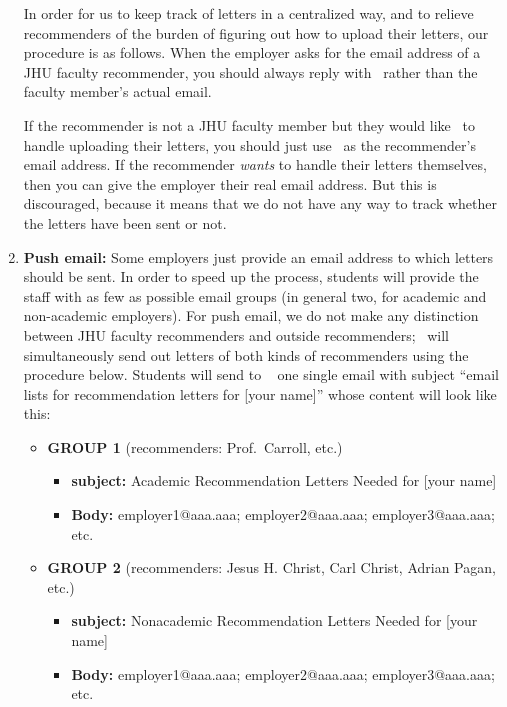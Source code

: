 \documentclass{econtex}
\begin{document}
\begin{enumerate}
  In order for us to keep track of letters in a centralized way, and
  to relieve recommenders of the burden of figuring out how to
  upload their letters, our procedure is as follows.  When the
  employer asks for the email address of a JHU faculty recommender, you should
  always reply with \JMStaffEmail~rather than the faculty member's
  actual email.

  If the recommender is not a JHU faculty member but they would like \JMStaff~to handle uploading their letters, you should just use \JMStaffEmail~as the recommender's email address.  If the recommender {\it wants} to handle their letters themselves, then you can give the employer their real email address.  But this is discouraged, because it means that we do not have any way to track whether the letters have been sent or not.

\item {\bf Push email:} Some employers just provide an email address
  to which letters should be sent.  In order to speed up the process,
  students will provide the staff with as few as possible email groups
  (in general two, for academic and non-academic employers). For push email, we do not 
make any distinction between JHU faculty recommenders and outside recommenders; \JMStaff~will
simultaneously send out letters of both kinds of recommenders using the procedure below.  Students will send to \JMStaffEmail~ one single email
  with subject ``email lists for recommendation letters for [your
  name]'' whose content will look like this: \small
\begin{itemize}
\item {\bf  GROUP 1} (recommenders: Prof.\ Carroll, etc.)
\begin{itemize}
\item {\bf  subject:} Academic Recommendation Letters Needed for [your name]
\item {\bf  Body:} employer1@aaa.aaa; employer2@aaa.aaa; employer3@aaa.aaa; etc.
\end{itemize}

\item {\bf  GROUP 2} (recommenders: Jesus H. Christ, Carl Christ, Adrian Pagan, etc.)
\begin{itemize}
\item {\bf  subject:} Nonacademic Recommendation Letters Needed for [your name]
\item {\bf  Body:} employer1@aaa.aaa; employer2@aaa.aaa; employer3@aaa.aaa; etc.
\end{itemize}


\end{itemize}
\end{enumerate}
\end{document}
